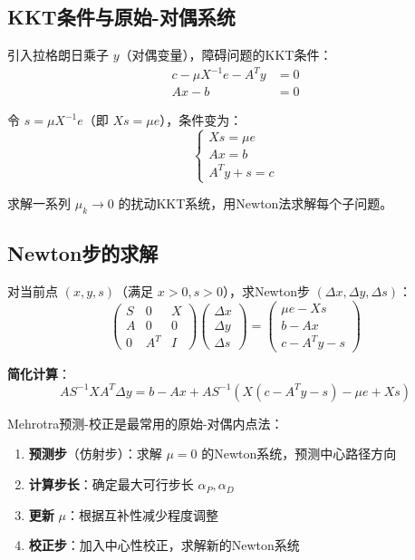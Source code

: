 \subsection{KKT条件与原始-对偶系统}

引入拉格朗日乘子 $y$（对偶变量），障碍问题的KKT条件：
\begin{align*}
c - \mu X^{-1}e - A^T y &= 0 \\
Ax - b &= 0
\end{align*}

令 $s = \mu X^{-1}e$（即 $Xs = \mu e$），条件变为：
\[
\begin{cases}
Xs = \mu e \\
Ax = b \\
A^T y + s = c
\end{cases}
\]

\begin{definition}[原始-对偶内点法]
求解一系列 $\mu_k \to 0$ 的扰动KKT系统，用Newton法求解每个子问题。
\end{definition}

\subsection{Newton步的求解}

对当前点 $(x, y, s)$（满足 $x > 0, s > 0$），求Newton步 $(\Delta x, \Delta y, \Delta s)$：
\[
\begin{pmatrix}
S & 0 & X \\
A & 0 & 0 \\
0 & A^T & I
\end{pmatrix}
\begin{pmatrix} \Delta x \\ \Delta y \\ \Delta s \end{pmatrix} =
\begin{pmatrix} \mu e - Xs \\ b - Ax \\ c - A^T y - s \end{pmatrix}
\]

\textbf{简化计算}：
\[
A S^{-1} X A^T \Delta y = b - Ax + A S^{-1}(X(c-A^T y-s) - \mu e + Xs)
\]

\begin{notebox}
Mehrotra预测-校正是最常用的原始-对偶内点法：
\begin{enumerate}[label=\arabic*.]
    \item \textbf{预测步}（仿射步）：求解 $\mu = 0$ 的Newton系统，预测中心路径方向
    \item \textbf{计算步长}：确定最大可行步长 $\alpha_P, \alpha_D$
    \item \textbf{更新} $\mu$：根据互补性减少程度调整
    \item \textbf{校正步}：加入中心性校正，求解新的Newton系统
\end{enumerate}
\end{notebox}

